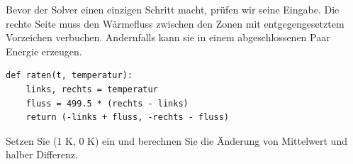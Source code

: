 Bevor der Solver einen einzigen Schritt macht, prüfen wir seine Eingabe. Die rechte Seite muss den Wärmefluss zwischen den Zonen mit entgegengesetztem Vorzeichen verbuchen. Andernfalls kann sie in einem abgeschlossenen Paar Energie erzeugen.
{\small\begin{verbatim}
def raten(t, temperatur):
    links, rechts = temperatur
    fluss = 499.5 * (rechts - links)
    return (-links + fluss, -rechts - fluss)
\end{verbatim}}
Setzen Sie (1 K, 0 K) ein und berechnen Sie die Änderung von Mittelwert und halber Differenz.
